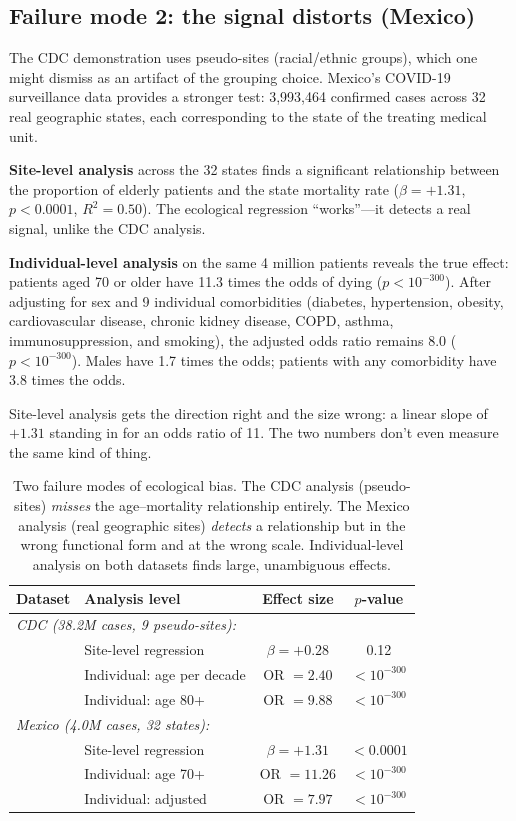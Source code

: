 \documentclass{article}
\begin{document}
\subsection{Failure mode 2: the signal distorts (Mexico)}

The CDC demonstration uses pseudo-sites (racial/ethnic groups), which one
might dismiss as an artifact of the grouping choice.  Mexico's COVID-19
surveillance data provides a stronger test: 3,993,464 confirmed cases across
32 real geographic states, each corresponding to the state of the treating
medical unit.

\textbf{Site-level analysis} across the 32 states finds a significant
relationship between the proportion of elderly patients and the state
mortality rate ($\beta = +1.31$, $p < 0.0001$, $R^2 = 0.50$).  The
ecological regression ``works''---it detects a real signal, unlike the CDC
analysis.

\textbf{Individual-level analysis} on the same 4 million patients reveals the
true effect: patients aged 70 or older have 11.3 times the odds of dying
($p < 10^{-300}$).  After adjusting for sex and 9 individual comorbidities
(diabetes, hypertension, obesity, cardiovascular disease, chronic kidney
disease, COPD, asthma, immunosuppression, and smoking), the adjusted odds
ratio remains 8.0 ($p < 10^{-300}$).  Males have 1.7 times the odds;
patients with any comorbidity have 3.8 times the odds.

Site-level analysis gets the direction right and the size wrong: a linear
slope of $+1.31$ standing in for an odds ratio of 11.  The two numbers
don't even measure the same kind of thing.

\begin{table}[t]
\centering
\caption{Two failure modes of ecological bias.  The CDC analysis (pseudo-sites)
\emph{misses} the age--mortality relationship entirely.  The Mexico analysis
(real geographic sites) \emph{detects} a relationship but in the wrong
functional form and at the wrong scale.  Individual-level analysis on both
datasets finds large, unambiguous effects.}
\label{tab:ecological}
\begin{tabular}{llcc}
\toprule
Dataset & Analysis level & Effect size & $p$-value \\
\midrule
\multicolumn{4}{l}{\emph{CDC (38.2M cases, 9 pseudo-sites):}} \\
& Site-level regression & $\beta = +0.28$ & 0.12 \\
& Individual: age per decade & OR $= 2.40$ & $< 10^{-300}$ \\
& Individual: age 80+ & OR $= 9.88$ & $< 10^{-300}$ \\
\midrule
\multicolumn{4}{l}{\emph{Mexico (4.0M cases, 32 states):}} \\
& Site-level regression & $\beta = +1.31$ & $< 0.0001$ \\
& Individual: age 70+ & OR $= 11.26$ & $< 10^{-300}$ \\
& Individual: adjusted & OR $= 7.97$ & $< 10^{-300}$ \\
\bottomrule
\end{tabular}
\end{table}
\end{document}
